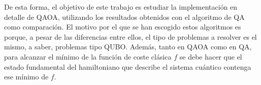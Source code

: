 De esta forma, el objetivo de este trabajo es estudiar la implementación en detalle de QAOA, utilizando los resultados obtenidos con el algoritmo de QA como comparación.
El motivo por el que se han escogido estos algoritmos es porque, a pesar de las diferencias entre ellos, el tipo de problemas a resolver es el mismo, a saber, problemas tipo QUBO\@.
Además, tanto en QAOA como en QA, para alcanzar el mínimo de la función de coste clásica $f$ se debe hacer que el estado fundamental  %
del hamiltoniano que describe el sistema cuántico contenga ese mínimo de $f$.



